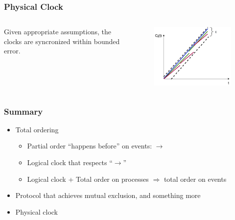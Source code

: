 \documentclass{beamer}
\begin{document}
\frame
{
  \frametitle{Physical Clock}
	\begin{columns}
	\begin{column}{0.6\textwidth}
		Given appropriate assumptions, the clocks are syncronized within bounded error.
	\end{column}
	\begin{column}{0.4\textwidth}

		\begin{figure}[ht!]
		\includegraphics[width=\textwidth]{files/ClockDist-Physical-Clock-5.png}
		\end{figure}

	\end{column}
	\end{columns}
}

\frame
{
  \frametitle{Summary}
  \begin{itemize}
  	\item Total ordering
  		\begin{itemize}
  			\item Partial order ``happens before'' on events: $\to$
  			\item Logical clock that respects ``$\to$''
  			\item Logical clock + Total order on processes $\Rightarrow$ total order on events
  		\end{itemize}
  	\item Protocol that achieves mutual exclusion, and something more
  	\item Physical clock
  \end{itemize}
}

\iffalse
\end{document}
